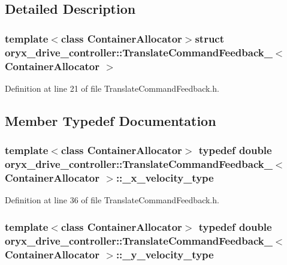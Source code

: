 \subsection{\-Detailed \-Description}
\subsubsection*{template$<$class \-Container\-Allocator$>$struct oryx\-\_\-drive\-\_\-controller\-::\-Translate\-Command\-Feedback\-\_\-$<$ Container\-Allocator $>$}



\-Definition at line 21 of file \-Translate\-Command\-Feedback.\-h.



\subsection{\-Member \-Typedef \-Documentation}
\subsubsection[{\-\_\-x\-\_\-velocity\-\_\-type}]{\setlength{\rightskip}{0pt plus 5cm}template$<$class \-Container\-Allocator$>$ typedef double {\bf oryx\-\_\-drive\-\_\-controller\-::\-Translate\-Command\-Feedback\-\_\-}$<$ \-Container\-Allocator $>$\-::{\bf \-\_\-x\-\_\-velocity\-\_\-type}}\label{structoryx__drive__controller_1_1TranslateCommandFeedback___ad3760c231cd6c657adb0bf08e797ca3d}


\-Definition at line 36 of file \-Translate\-Command\-Feedback.\-h.

\subsubsection[{\-\_\-y\-\_\-velocity\-\_\-type}]{\setlength{\rightskip}{0pt plus 5cm}template$<$class \-Container\-Allocator$>$ typedef double {\bf oryx\-\_\-drive\-\_\-controller\-::\-Translate\-Command\-Feedback\-\_\-}$<$ \-Container\-Allocator $>$\-::{\bf \-\_\-y\-\_\-velocity\-\_\-type}}\label{structoryx__drive__controller_1_1TranslateCommandFeedback___a7b02d235d781dfb6c4aebe723b1928b5}


